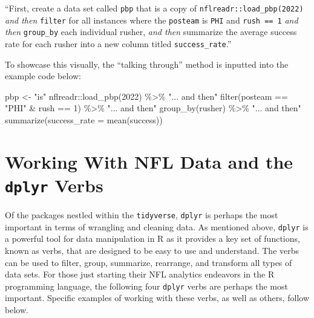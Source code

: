 \documentclass[
  letterpaper,
]{krantz}
\newenvironment{Shaded}{\begin{snugshade}}{\end{snugshade}}
\newcommand{\AttributeTok}[1]{\textcolor[rgb]{0.40,0.45,0.13}{#1}}
\newcommand{\DecValTok}[1]{\textcolor[rgb]{0.68,0.00,0.00}{#1}}
\newcommand{\FunctionTok}[1]{\textcolor[rgb]{0.28,0.35,0.67}{#1}}
\newcommand{\NormalTok}[1]{\textcolor[rgb]{0.00,0.23,0.31}{#1}}
\newcommand{\OtherTok}[1]{\textcolor[rgb]{0.00,0.23,0.31}{#1}}
\newcommand{\SpecialCharTok}[1]{\textcolor[rgb]{0.37,0.37,0.37}{#1}}
\newcommand{\StringTok}[1]{\textcolor[rgb]{0.13,0.47,0.30}{#1}}
\begin{document}
``First, create a data set called \texttt{pbp} that is a copy of
\texttt{nflreadr::load\_pbp(2022)} \emph{and then} \texttt{filter} for
all instances where the \texttt{posteam} is \texttt{PHI} and
\texttt{rush\ ==\ 1} \emph{and then} \texttt{group\_by} each individual
rusher, \emph{and then} summarize the average success rate for each
rusher into a new column titled \texttt{success\_rate}.''

To showcase this visually, the ``talking through'' method is inputted
into the example code below:

\begin{Shaded}
\begin{Highlighting}[]
\NormalTok{pbp }\OtherTok{\textless{}{-}} \StringTok{"is"}\NormalTok{ nflreadr}\SpecialCharTok{::}\FunctionTok{load\_pbp}\NormalTok{(}\DecValTok{2022}\NormalTok{) }\SpecialCharTok{\%\textgreater{}\%} \StringTok{"... and then"}
  \FunctionTok{filter}\NormalTok{(posteam }\SpecialCharTok{==} \StringTok{"PHI"} \SpecialCharTok{\&}\NormalTok{ rush }\SpecialCharTok{==} \DecValTok{1}\NormalTok{) }\SpecialCharTok{\%\textgreater{}\%} \StringTok{"... and then"}
  \FunctionTok{group\_by}\NormalTok{(rusher) }\SpecialCharTok{\%\textgreater{}\%} \StringTok{"... and then"}
  \FunctionTok{summarize}\NormalTok{(}\AttributeTok{success\_rate =} \FunctionTok{mean}\NormalTok{(success))}
\end{Highlighting}
\end{Shaded}

\hypertarget{working-with-nfl-data-and-the-dplyr-verbs}{%
\section{\texorpdfstring{Working With NFL Data and the \texttt{dplyr}
Verbs}{Working With NFL Data and the dplyr Verbs}}\label{working-with-nfl-data-and-the-dplyr-verbs}}

Of the packages nestled within the \texttt{tidyverse}, \texttt{dplyr} is
perhaps the most important in terms of wrangling and cleaning data. As
mentioned above, \texttt{dplyr} is a powerful tool for data manipulation
in R as it provides a key set of functions, known as verbs, that are
designed to be easy to use and understand. The verbs can be used to
filter, group, summarize, rearrange, and transform all types of data
sets. For those just starting their NFL analytics endeavors in the R
programming language, the following four \texttt{dplyr} verbs are
perhaps the most important. Specific examples of working with these
verbs, as well as others, follow below.
\end{document}
